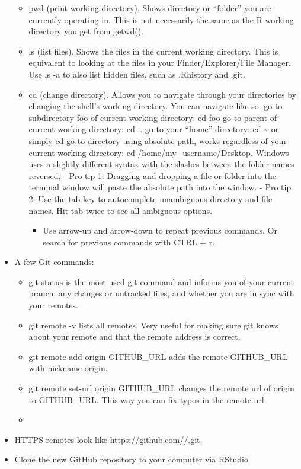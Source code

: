 \documentclass[
]{article}
\providecommand{\tightlist}{%
  \setlength{\itemsep}{0pt}\setlength{\parskip}{0pt}}
\begin{document}
\begin{itemize}
  \begin{itemize}
  \item
    pwd (print working directory). Shows directory or ``folder'' you
    are currently operating in. This is not necessarily the same as
    the R working directory you get from getwd().
  \item
    ls (list files). Shows the files in the current working
    directory. This is equivalent to looking at the files in your
    Finder/Explorer/File Manager. Use ls -a to also list hidden
    files, such as .Rhistory and .git.
  \item
    cd (change directory). Allows you to navigate through your
    directories by changing the shell's working directory. You can
    navigate like so: go to subdirectory foo of current working
    directory: cd foo go to parent of current working directory: cd
    .. go to your ``home'' directory: cd \textasciitilde{} or simply cd go to
    directory using absolute path, works regardless of your current
    working directory: cd /home/my\_username/Desktop. Windows uses a
    slightly different syntax with the slashes between the folder
    names reversed, - Pro
    tip 1: Dragging and dropping a file or folder into the terminal
    window will paste the absolute path into the window. - Pro tip
    2: Use the tab key to autocomplete unambiguous directory and
    file names. Hit tab twice to see all ambiguous options.

    \begin{itemize}
    \tightlist
    \item
      Use arrow-up and arrow-down to repeat previous commands. Or
      search for previous commands with CTRL + r.
    \end{itemize}
  \end{itemize}
\item
  A few Git commands:

  \begin{itemize}
  \tightlist
  \item
    git status is the most used git command and informs you of your
    current branch, any changes or untracked files, and whether you
    are in sync with your remotes.
  \item
    git remote -v lists all remotes. Very useful for making sure git
    knows about your remote and that the remote address is correct.
  \item
    git remote add origin GITHUB\_URL adds the remote GITHUB\_URL with
    nickname origin.
  \item
    git remote set-url origin GITHUB\_URL changes the remote url of
    origin to GITHUB\_URL. This way you can fix typos in the remote
    url.
  \item
  \end{itemize}
\item
  HTTPS remotes look like \url{https://github.com/}/.git.
\item
  Clone the new GitHub repository to your computer via RStudio


\end{itemize}
\end{document}
